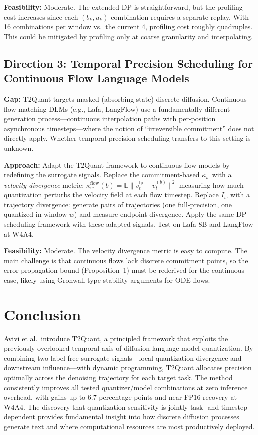 \documentclass[11pt,a4paper]{article}
\begin{document}
\textbf{Feasibility:} Moderate. The extended DP is straightforward, but the profiling cost increases since each $(b_k, u_k)$ combination requires a separate replay. With 16 combinations per window vs.\ the current 4, profiling cost roughly quadruples. This could be mitigated by profiling only at coarse granularity and interpolating.

\subsection{Direction 3: Temporal Precision Scheduling for Continuous Flow Language Models}
\textbf{Gap:} T2Quant targets masked (absorbing-state) discrete diffusion. Continuous flow-matching DLMs (e.g., Lafa, LangFlow) use a fundamentally different generation process---continuous interpolation paths with per-position asynchronous timesteps---where the notion of ``irreversible commitment'' does not directly apply. Whether temporal precision scheduling transfers to this setting is unknown.

\textbf{Approach:} Adapt the T2Quant framework to continuous flow models by redefining the surrogate signals. Replace the commitment-based $\kappa_w$ with a \emph{velocity divergence} metric: $\kappa^{\text{flow}}_w(b) = \mathbb{E}\|v^{\text{fp}}_t - v^{(b)}_t\|^2$ measuring how much quantization perturbs the velocity field at each flow timestep. Replace $I_w$ with a trajectory divergence: generate pairs of trajectories (one full-precision, one quantized in window $w$) and measure endpoint divergence. Apply the same DP scheduling framework with these adapted signals. Test on Lafa-8B and LangFlow at W4A4.

\textbf{Feasibility:} Moderate. The velocity divergence metric is easy to compute. The main challenge is that continuous flows lack discrete commitment points, so the error propagation bound (Proposition~1) must be rederived for the continuous case, likely using Gronwall-type stability arguments for ODE flows.

\section{Conclusion}
Avivi et al.\ introduce T2Quant, a principled framework that exploits the previously overlooked temporal axis of diffusion language model quantization. By combining two label-free surrogate signals---local quantization divergence and downstream influence---with dynamic programming, T2Quant allocates precision optimally across the denoising trajectory for each target task. The method consistently improves all tested quantizer/model combinations at zero inference overhead, with gains up to 6.7 percentage points and near-FP16 recovery at W4A4. The discovery that quantization sensitivity is jointly task- and timestep-dependent provides fundamental insight into how discrete diffusion processes generate text and where computational resources are most productively deployed.
\end{document}
